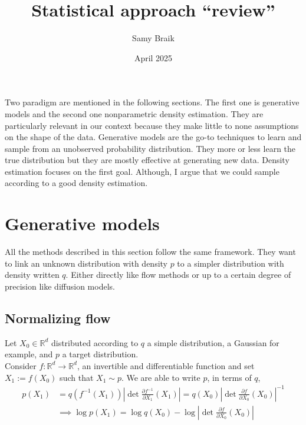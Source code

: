 \documentclass{article}
\title{Statistical approach ``review''}
\author{Samy Braik}
\date{April 2025}
\begin{document}
\maketitle

Two paradigm are mentioned in the following sections. The first one is generative models and the second one nonparametric density estimation. They are particularly relevant in our context because they make little to none assumptions on the shape of the data.
Generative models are the go-to techniques to learn and sample from an unobserved probability distribution. They more or less learn the true distribution but they are mostly effective at generating new data. Density estimation focuses on the first goal. Although, I argue that we could sample according to a good density estimation.

\section{Generative models}
All the methods described in this section follow the same framework. They want to link an unknown distribution with density \(p\) to a simpler distribution with density written \(q\). Either directly like flow methods or up to a certain degree of precision like diffusion models.
\subsection{Normalizing flow}
Let \(X_0\in\mathbb{R}^d\) distributed according to \(q\) a simple distribution, a Gaussian for example, and \(p\) a target distribution.
\\
Consider \(f:\mathbb{R}^d\rightarrow\mathbb{R}^d\), an invertible and differentiable function and set \(X_1:=f(X_0)\) such that \(X_1\sim p\). 
We are able to write \(p\), in terms of \(q\), 
\begin{align}
    p(X_1)&=q(f^{-1}(X_1))\left| \det\frac{\partial f^{-1}}{\partial X_1}(X_1) \right| = q(X_0)\left| \det \frac{\partial f}{\partial X_0}(X_0) \right|^{-1} \\
    &\implies \log p(X_1)=\log q(X_0) - \log \left|  \det \frac{\partial f}{\partial X_0}(X_0) \right|  
\end{align}
\end{document}
